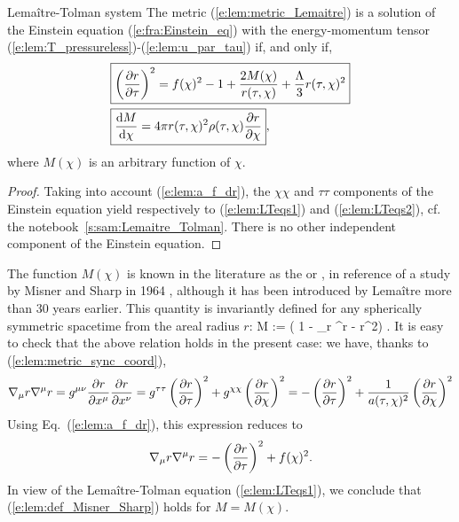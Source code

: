 \begin{tprop}{Lemaître-Tolman system}{}
The metric (\ref{e:lem:metric_Lemaitre}) is a solution of the
Einstein equation (\ref{e:fra:Einstein_eq}) with the energy-momentum tensor (\ref{e:lem:T_pressureless})-(\ref{e:lem:u_par_tau}) if, and only if,
\begin{subequations}\label{e:lem:LTeqs}
\begin{align}
 & \fbox{$\displaystyle \left( \frac{\partial r}{\partial \tau} \right) ^2 = f(\chi)^2 - 1 + \frac{2M(\chi)}{r(\tau,\chi)}
   + \frac{\Lambda}{3} r(\tau,\chi)^2 $} \label{e:lem:LTeqs1} \\
 & \fbox{$\displaystyle \frac{\mathrm{d} M}{\mathrm{d}\chi} = 4\pi r(\tau,\chi)^2 \rho(\tau,\chi) \frac{\partial r}{\partial \chi} $} ,
    \label{e:lem:LTeqs2}
 \end{align}
\end{subequations}
where $M(\chi)$ is an arbitrary function of $\chi$.
\end{tprop}

\begin{proof}
Taking into account (\ref{e:lem:a_f_dr}), the $\chi\chi$ and $\tau\tau$ components of the Einstein equation
yield respectively to (\ref{e:lem:LTeqs1}) and (\ref{e:lem:LTeqs2}), cf. the notebook~\ref{s:sam:Lemaitre_Tolman}.
There is no other independent component of the Einstein equation.
\end{proof}

The function $M(\chi)$ is known in the literature as the  or , in reference
of a study by Misner and Sharp in 1964 \cite{MisneS64}, although it has been introduced
by Lemaître \cite{Lemai32} more than 30 years earlier. This quantity is
invariantly defined for any spherically symmetric spacetime from the areal radius $r$:
\be \label{e:lem:def_Misner_Sharp}
    M  :=  \left( 1 - \nabla_\mu r \nabla^\mu r  -  r^2\right) .
\ee
It is easy to check that the above relation holds in the present case:
we have, thanks to (\ref{e:lem:metric_sync_coord}),
\[
    \nabla_\mu r \nabla^\mu r = g^{\mu\nu} \frac{\partial r}{\partial x^\mu} \frac{\partial r}{\partial x^\nu}
        = g^{\tau\tau} \left( \frac{\partial r}{\partial \tau} \right)^2
        + g^{\chi\chi} \left( \frac{\partial r}{\partial \chi} \right)^2
        = - \left( \frac{\partial r}{\partial \tau} \right)^2 + \frac{1}{a(\tau,\chi)^2} \left( \frac{\partial r}{\partial \chi} \right)^2
\]
Using Eq.~(\ref{e:lem:a_f_dr}), this expression reduces to
\[
    \nabla_\mu r \nabla^\mu r = - \left( \frac{\partial r}{\partial \tau} \right)^2 + f(\chi)^2 .
\]
In view of the Lemaître-Tolman equation (\ref{e:lem:LTeqs1}), we conclude that
(\ref{e:lem:def_Misner_Sharp}) holds for $M = M(\chi)$.


